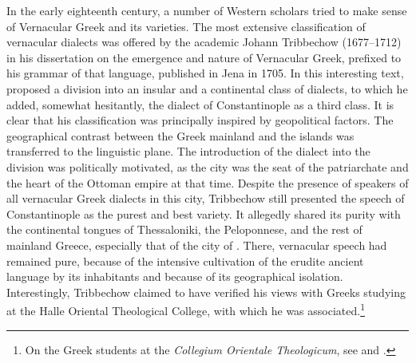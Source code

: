 In the early eighteenth century, a number of Western scholars tried to make sense of Vernacular Greek and its varieties. The most extensive classification of vernacular dialects was offered by the  academic Johann Tribbechow (1677–1712) in his dissertation on the emergence and nature of Vernacular Greek, prefixed to his grammar of that language, published in Jena in 1705. In this interesting text, \citet[a.4\textsc{\textsuperscript{r}}\textsc{–}a.4\textsc{\textsuperscript{v}}]{Tribbechow1705} proposed a division into an insular and a continental class of dialects, to which he added, somewhat hesitantly, the dialect of Constantinople as a third class. It is clear that his classification was principally inspired by geopolitical factors. The geographical contrast between the Greek mainland and the islands was transferred to the linguistic plane. The introduction of the  dialect into the division was politically motivated, as the city was the seat of the patriarchate and the heart of the Ottoman empire at that time. Despite the presence of speakers of all vernacular Greek dialects in this city, Tribbechow still presented the speech of Constantinople as the purest and best variety. It allegedly shared its purity with the continental tongues of Thessaloniki, the Peloponnese, and the rest of mainland Greece, especially that of the city of . There, vernacular speech had remained pure, because of the intensive cultivation of the erudite ancient language by its inhabitants and because of its geographical isolation. Interestingly, Tribbechow claimed to have verified his views with Greeks studying at the Halle Oriental Theological College, with which he was associated.\footnote{On the Greek students at the \textit{Collegium Orientale Theologicum}, see \citet{Moennig1998} and \citet[283]{Makrides2006}.}

